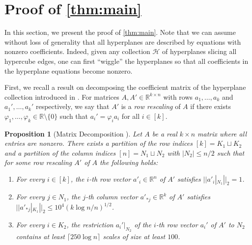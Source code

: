 \documentclass[reqno]{amsart}
\newtheorem{prop}[theorem]{Proposition}
\theoremstyle{remark}
\theoremstyle{definition}
\numberwithin{theorem}{section}
\renewcommand{\phi}{\varphi}
\renewcommand{\(}{\bigl(}
\renewcommand{\)}{\bigr)\vphantom{)}}
\newcommand{\cH}{\mathcal H}
\renewcommand{\le}{\leqslant}
\newcommand{\R}{\mathbb R}
\newcommand{\ceil}[1]{\lceil#1\rceil}
\begin{document}
\section{Proof of \cref{thm:main}}\label{sec:main-proof}

In this section, we present the proof of \cref{thm:main}. Note that we can assume without loss of generality that all hyperplanes are described by equations with nonzero coefficients. Indeed, given any collection $\cH$ of hyperplanes slicing all hypercube edges, one can first ``wiggle'' the hyperplanes so that all coefficients in the hyperplane equations become nonzero.


First, we recall a result on decomposing the coefficient matrix of the hyperplane collection introduced in \cite{yehuda2021slicing}. For matrices $A,A'\in \R^{k\times n}$ with rows $a_1,\dots, a_k$ and $a_1',\dots, a_k'$ respectively, we say that $A'$ is a \emph{row rescaling} of $A$ if there exists $\phi_1,\dots, \phi_k\in \R\setminus\{0\}$ such that $a_i' = \phi_i a_i$ for all $i\in [k]$.

\begin{prop}[Matrix Decomposition ]\label{prop:decomp}
Let $A$ be a real $k\times n$ matrix where all entries are  nonzero. There exists a partition of the row indices $[k] = K_1\sqcup K_2$ and a partition of the column indices $[n] = N_1\sqcup N_2$ with $|N_2|\le n/2$ such that for some row rescaling $A'$ of $A$ the following holds:
\begin{enumerate}
    \item For every $i\in [k]$, the $i$-th row vector $a'_i\in \R^n$ of $A'$ satisfies $||a'_i|_{N_1}||_2 = 1$.

    \item For every $j\in N_1$, the $j$-th column vector $a'_{*j}\in \R^k$ of $A'$ satisfies $||a'_{*j}|_{K_1}||_2\le  10^4(k\log n/n)^{1/2}$.

    \item For every $i\in K_2$, the restriction $a_i'|_{N_2}$ of the $i$-th row vector $a_i'$ of $A'$ to $N_2$ contains at least $\ceil{250\log n}$ scales of size at least $100$.
\end{enumerate}
\end{prop}
\end{document}
